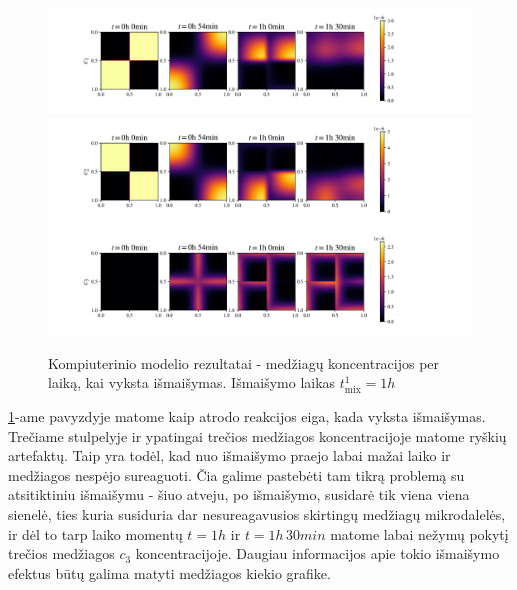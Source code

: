 \begin{figure}[h!]
\centering
\includegraphics[width=\textwidth]{../paper/assets/random-mix-example-c0-1.png} \\
\includegraphics[width=\textwidth]{../paper/assets/random-mix-example-c1-1.png} \\
\includegraphics[width=\textwidth]{../paper/assets/random-mix-example-c2-1.png}

\caption{Kompiuterinio modelio rezultatai - medžiagų koncentracijos per laiką, kai vyksta išmaišymas. Išmaišymo laikas $t^1_\text{mix} = 1h$ }

\label{mix-example}
\end{figure}

\ref{mix-example}-ame pavyzdyje matome kaip atrodo reakcijos eiga, kada vyksta išmaišymas. Trečiame stulpelyje ir ypatingai trečios medžiagos koncentracijoje matome ryškių artefaktų. Taip yra todėl, kad nuo išmaišymo praejo labai mažai laiko ir medžiagos nespėjo sureaguoti. Čia galime pastebėti tam tikrą problemą su atsitiktiniu išmaišymu - šiuo atveju, po išmaišymo, susidarė tik viena viena sienelė, ties kuria susiduria dar nesureagavusios skirtingų medžiagų mikrodalelės, ir dėl to tarp laiko momentų $t=1h$ ir $t=1h\,30min$ matome labai nežymų pokytį trečios medžiagos $c_3$ koncentracijoje. Daugiau informacijos apie tokio išmaišymo efektus būtų galima matyti medžiagos kiekio grafike.

